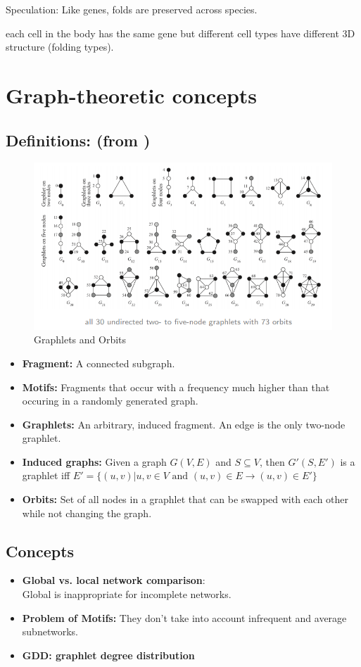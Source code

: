 \documentclass{article}
\begin{document}
Speculation: Like genes, folds are preserved across species.

each cell in the body has the same gene but different
cell types have different 3D structure (folding types).

\section{Graph-theoretic concepts}
\subsection*{Definitions: (from \cite{Automorphisms})}
\begin{figure}
    \centering
    \includegraphics[scale=.5]{graphlets.png}
    \caption{Graphlets and Orbits}
    \label{fig:graphletsAndOrbits}
\end{figure}
\begin{itemize}
    \item \textbf{Fragment:} A connected subgraph.
    \item \textbf{Motifs:} Fragments that occur with a frequency much higher than
        that occuring in a randomly generated graph.
    \item \textbf{Graphlets:} An arbitrary, induced fragment.
An edge is the only two-node graphlet.
    \item \textbf{Induced graphs:} Given a graph $G(V, E)$ and $S \subseteq V$, then $G'(S, E')$
        is a graphlet iff $E' = \{(u, v) | u, v \in V \text{ and } 
        (u, v) \in E \rightarrow (u, v) \in E'\}$
    \item \textbf{Orbits:} Set of all nodes in a graphlet that can be
        swapped with each other while not changing the graph.
\end{itemize}
\subsection*{Concepts}
\begin{itemize}
    \item \textbf{Global vs. local network comparison}:\\
        Global is inappropriate for incomplete networks.

    \item \textbf{Problem of Motifs:}
        They don't take into account infrequent and average subnetworks.

    \item \textbf{GDD: graphlet degree distribution}
\end{itemize}
\end{document}
